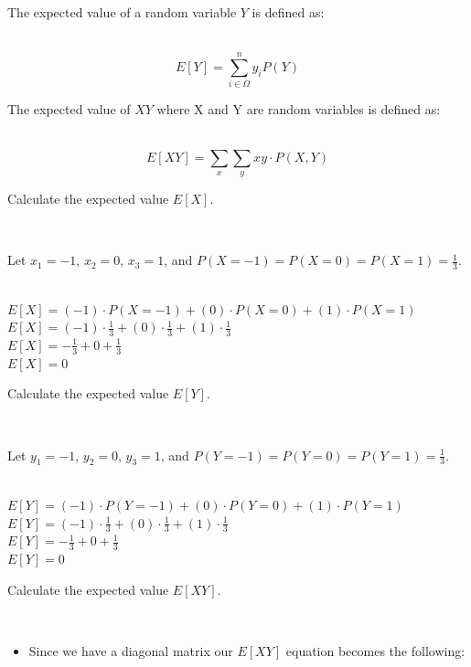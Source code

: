 \documentclass{article}
\begin{document}
\parbox{\textwidth}{The expected value of a random variable $Y$ is defined as:}\\

$$E[Y] = \sum^{n}_{i\in \Omega} y_i P(Y)$$

\parbox{\textwidth}{The expected value of $XY$  where X and Y are random variables is defined as:}\\

$$E[XY] = \sum_{x} \sum_{y} xy \cdot P(X,Y)$$

\parbox{\textwidth}{Calculate the expected value $E[X]$.}\\

\parbox{\textwidth}{Let $x_1 = -1$, $x_2 = 0$, $x_3 = 1$, and $P(X=-1) = P(X=0) = P(X=1) = \frac{1}{3}$.}\\

$E[X] = (-1) \cdot P(X = -1) + (0) \cdot P(X = 0) + (1) \cdot P(X = 1)$\\

$E[X] = (-1) \cdot \frac{1}{3} + (0) \cdot \frac{1}{3} + (1) \cdot \frac{1}{3}$\\

$E[X] = -\frac{1}{3} + 0 + \frac{1}{3}$\\

$E[X] = 0$\\

\parbox{\textwidth}{Calculate the expected value $E[Y]$.}\\

\parbox{\textwidth}{Let $y_1 = -1$, $y_2 = 0$, $y_3 = 1$, and $P(Y=-1) = P(Y=0) = P(Y=1) = \frac{1}{3}$.}\\

$E[Y] = (-1) \cdot P(Y = -1) + (0) \cdot P(Y = 0) + (1) \cdot P(Y = 1)$\\

$E[Y] = (-1) \cdot \frac{1}{3} + (0) \cdot \frac{1}{3} + (1) \cdot \frac{1}{3}$\\

$E[Y] = -\frac{1}{3} + 0 + \frac{1}{3}$\\

$E[Y] = 0$\\

\parbox{\textwidth}{Calculate the expected value $E[XY]$.}\\

\begin{itemize}
    \item \parbox{\textwidth}{Since we have a diagonal matrix our $E[XY]$ equation becomes the following:}
\end{itemize}
\end{document}
